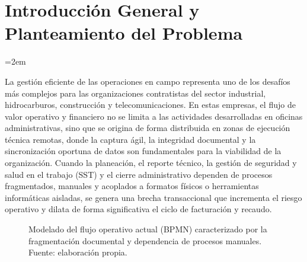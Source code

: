 
\chapter{Introducción General y Planteamiento del Problema}
\label{ch:introduccion}

\setlength{\parindent}{0pt}
\setlength{\parskip}{6pt}
\sloppy
\emergencystretch=2em
\raggedbottom

La gestión eficiente de las operaciones en campo representa uno de los desafíos más complejos para las organizaciones contratistas del sector industrial, hidrocarburos, construcción y telecomunicaciones. En estas empresas, el flujo de valor operativo y financiero no se limita a las actividades desarrolladas en oficinas administrativas, sino que se origina de forma distribuida en zonas de ejecución técnica remotas, donde la captura ágil, la integridad documental y la sincronización oportuna de datos son fundamentales para la viabilidad de la organización. Cuando la planeación, el reporte técnico, la gestión de seguridad y salud en el trabajo (SST) y el cierre administrativo dependen de procesos fragmentados, manuales y acoplados a formatos físicos o herramientas informáticas aisladas, se genera una brecha transaccional que incrementa el riesgo operativo y dilata de forma significativa el ciclo de facturación y recaudo.

\begin{figure}[!htbp]
\centering
\resizebox{0.95\textwidth}{!}{%
%
}
\caption{Modelado del flujo operativo actual (BPMN) caracterizado por la fragmentación documental y dependencia de procesos manuales. Fuente: elaboración propia.}
\label{fig:bpmn-actual}
\end{figure}

